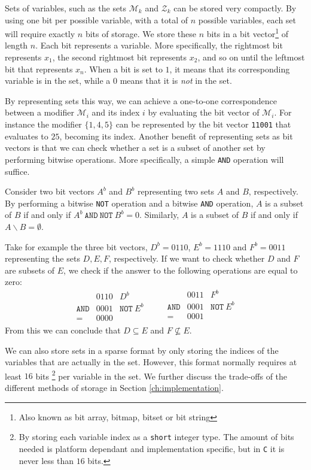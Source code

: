 Sets of variables, such as the sets $\mathcal{M}_k$ and $\mathcal{Z}_k$ can be
stored very compactly.
By using one bit per possible variable, with a total of $n$ possible variables,
each set will require exactly $n$ bits of storage.
We store these $n$ bits in a bit vector\footnote{Also known as bit array,
bitmap, bitset or bit string} of length $n$.
Each bit represents a variable. More specifically, the rightmost bit represents
$x_1$, the second rightmost bit represents $x_2$, and so on until the leftmost
bit that represents $x_n$.
When a bit is set to $1$, it means that its corresponding variable is in
the set, while a $0$ means that it is \emph{not} in the set.

By representing sets this way, we can achieve a one-to-one correspondence
between a modifier $\mathcal{M}_i$ and its index $i$ by evaluating the bit
vector of $\mathcal{M}_i$. For instance the modifier $\{ {1,4,5} \}$ can be
represented by the bit vector \texttt{11001} that evaluates to $25$, becoming
its index. Another benefit of representing sets as bit vectors is
that we can check whether a set is a
subset of another set by performing bitwise operations. More specifically,
a simple \texttt{AND} operation will suffice.

Consider two bit vectors $A^b$ and $B^b$ representing two sets $A$ and
$B$, respectively.
By performing a bitwise \texttt{NOT} operation and a bitwise \texttt{AND}
operation, $A$ is a subset of $B$ if and only if
$A^b~\texttt{AND}~\texttt{NOT}~B^b = 0$.
Similarly, $A$ is a subset of $B$ if and only if $A \backslash B = \emptyset$.

Take for example the three bit vectors, $D^b = 0110$, $E^b = 1110$ and
$F^b = 0011$ representing the sets $D, E, F$, respectively.
If we want to check whether $D$ and $F$ are subsets of $E$, we check if the
answer to the following operations are equal to zero:
\[
\begin{array}{lrl}
                 & 0110 & D^b \\
    \texttt{AND} & 0001 & \texttt{NOT}~E^b \\ \hline
    =            & 0000
\end{array}
\qquad
\begin{array}{lrl}
                 & 0011 & F^b \\
    \texttt{AND} & 0001 & \texttt{NOT}~E^b \\ \hline
    =            & 0001 \\
\end{array}
\]
From this we can conclude that $D \subseteq E$ and $F \not\subseteq E$.

We can also store sets in a sparse
format by only storing the indices of the variables that are actually in the
set.
However, this format normally requires at least $16$ bits\nolinebreak
\footnote{By storing each variable index as a \texttt{short} integer type.
The amount of bits needed is platform dependant and implementation specific,
but in \texttt{C} it is never less than $16$ bits.}
per variable in the set.
We further discuss the trade-offs of the different methods of storage in
Section \ref{ch:implementation}.
